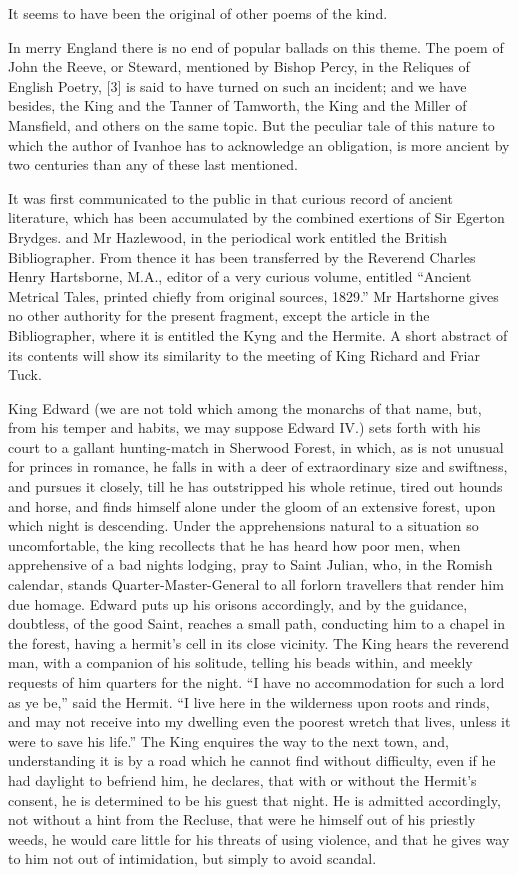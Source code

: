 It seems to have been the original of other poems of the kind.

In merry England there is no end of popular ballads on this theme. The
poem of John the Reeve, or Steward, mentioned by Bishop Percy, in the
Reliques of English Poetry, {[}3{]} is said to have turned on such an
incident; and we have besides, the King and the Tanner of Tamworth, the
King and the Miller of Mansfield, and others on the same topic. But the
peculiar tale of this nature to which the author of Ivanhoe has to
acknowledge an obligation, is more ancient by two centuries than any of
these last mentioned.

It was first communicated to the public in that curious record of
ancient literature, which has been accumulated by the combined exertions
of Sir Egerton Brydges. and Mr Hazlewood, in the periodical work
entitled the British Bibliographer. From thence it has been transferred
by the Reverend Charles Henry Hartsborne, M.A., editor of a very curious
volume, entitled ``Ancient Metrical Tales, printed chiefly from original
sources, 1829.'' Mr Hartshorne gives no other authority for the present
fragment, except the article in the Bibliographer, where it is entitled
the Kyng and the Hermite. A short abstract of its contents will show its
similarity to the meeting of King Richard and Friar Tuck.

King Edward (we are not told which among the monarchs of that name, but,
from his temper and habits, we may suppose Edward IV.) sets forth with
his court to a gallant hunting-match in Sherwood Forest, in which, as is
not unusual for princes in romance, he falls in with a deer of
extraordinary size and swiftness, and pursues it closely, till he has
outstripped his whole retinue, tired out hounds and horse, and finds
himself alone under the gloom of an extensive forest, upon which night
is descending. Under the apprehensions natural to a situation so
uncomfortable, the king recollects that he has heard how poor men, when
apprehensive of a bad nights lodging, pray to Saint Julian, who, in the
Romish calendar, stands Quarter-Master-General to all forlorn travellers
that render him due homage. Edward puts up his orisons accordingly, and
by the guidance, doubtless, of the good Saint, reaches a small path,
conducting him to a chapel in the forest, having a hermit's cell in its
close vicinity. The King hears the reverend man, with a companion of his
solitude, telling his beads within, and meekly requests of him quarters
for the night. ``I have no accommodation for such a lord as ye be,''
said the Hermit. ``I live here in the wilderness upon roots and rinds,
and may not receive into my dwelling even the poorest wretch that lives,
unless it were to save his life.'' The King enquires the way to the next
town, and, understanding it is by a road which he cannot find without
difficulty, even if he had daylight to befriend him, he declares, that
with or without the Hermit's consent, he is determined to be his guest
that night. He is admitted accordingly, not without a hint from the
Recluse, that were he himself out of his priestly weeds, he would care
little for his threats of using violence, and that he gives way to him
not out of intimidation, but simply to avoid scandal.


